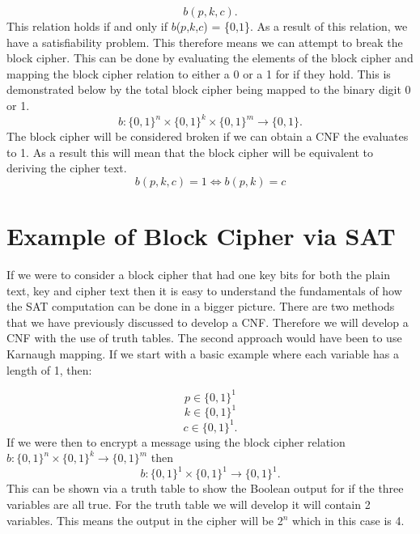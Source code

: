 \documentclass[11pt,a4paper, notitlepage]{report}
\begin{document}
\begin{displaymath}
b(p,k,c).
\end{displaymath}
This relation holds if and only if $b$($p$,$k$,$c$) = \{$0$,$1$\}. As a result of this relation, we have a satisfiability problem. This therefore means we can attempt to break the block cipher. This can be done by evaluating the elements of the block cipher and mapping the block cipher relation to either a 0 or a 1 for if they hold. This is demonstrated below by the total block cipher being mapped to the binary digit 0 or 1. 
\begin{displaymath}
b:  \{0,1\}^n \times \{0,1\}^k \times \{0,1\}^m \rightarrow \{0,1\}.
\end{displaymath}
The block cipher will be considered broken if we can obtain a CNF the evaluates to 1. As a result this will mean that the block cipher will be equivalent to deriving the cipher text. 
\begin{displaymath}
b(p,k,c) = 1 \Leftrightarrow b(p,k) = c
\end{displaymath}




\section{Example of Block Cipher via SAT}
\label{sec:examplebcsat}

If we were to consider a block cipher that had one key bits for both the plain text, key and cipher text then it is easy to understand the fundamentals of how the SAT computation can be done in a bigger picture. There are two methods that we have previously discussed to develop a CNF. Therefore we will develop a CNF with the use of truth tables. The second approach would have been to use Karnaugh mapping. If we start with a basic example where each variable has a length of 1, then:

\begin{displaymath}
p \in \{0,1\}^{1}
\end{displaymath}
\begin{displaymath}
k \in \{0,1\}^{1}
\end{displaymath}
\begin{displaymath}
c \in \{0,1\}^{1}.
\end{displaymath}
If we were then to encrypt a message using the block cipher relation $b: \{0,1\}^n \times \{0,1\}^k \rightarrow \{0,1\}^m$ then
\begin{displaymath}
b: \{0,1\}^{1} \times \{0,1\}^1 \rightarrow \{0,1\}^1.
\end{displaymath}
This can be shown via a truth table to show the Boolean output for if the three variables are all true. For the truth table we will develop it will contain 2 variables. This means the output in the cipher will be 2$^{n}$ which in this case is 4.
\end{document}
